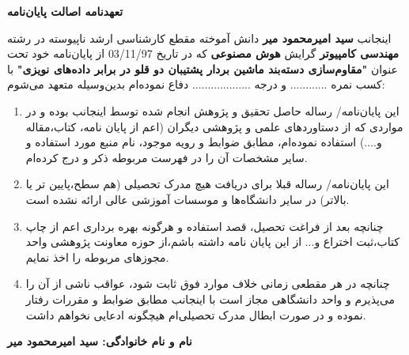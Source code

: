\thispagestyle{empty}
\noindent

\textbf{\Large تعهدنامه اصالت  پایان‌نامه}
\vskip 1cm

اینجانب \textbf{سید امیرمحمود میر} دانش آموخته مقطع کارشناسی ارشد ناپیوسته در رشته \textbf{مهندسی کامپیوتر} گرایش \textbf{هوش مصنوعی} که در تاریخ 03/11/97 از پایان‌نامه خود تحت عنوان \textbf{"مقاوم‌سازی دسته‌بند ماشین بردار پشتیبان دو قلو در برابر داده‌های نویزی"} با کسب نمره ............ و درجه ................... دفاع نموده‌ام بدین‌وسیله متعهد می‌شوم:
\begin{enumerate}
	\item این پایان‌نامه/ رساله حاصل تحقیق و پژوهش انجام شده توسط اینجانب بوده و در مواردی که از دستاوردهای علمی و پژوهشی دیگران (اعم از پایان نامه، کتاب،مقاله و....) استفاده نموده‌ام، مطابق ضوابط و رویه موجود، نام منبع مورد استفاده و سایر مشخصات آن را در فهرست مربوطه ذکر و درج کرده‌ام.
	\item این پایان‌نامه/ رساله قبلا برای دریافت هیچ مدرک تحصیلی (هم سطح،پایین تر یا بالاتر) در سایر دانشگاه‌ها و موسسات آموزشی عالی ارائه نشده است.
	\item 	چنانچه بعد از فراغت تحصیل، قصد استفاده و هرگونه بهره برداری اعم از چاپ کتاب،ثبت اختراع و... از این پایان نامه داشته باشم،از حوزه معاونت پژوهشی واحد مجوزهای مربوطه را اخذ نمایم.
	\item 	چنانچه در هر مقطعی زمانی خلاف موارد فوق ثابت شود، عواقب ناشی از آن را می‌پذیرم و واحد دانشگاهی مجاز است با اینجانب مطابق ضوابط و مقررات رفتار نموده و در صورت ابطال مدرک تحصیلی‌ام هیچگونه ادعایی نخواهم داشت.
\end{enumerate}

\vskip 0.5cm
\begin{flushleft}
\textbf{نام و نام خانوادگی: سید امیرمحمود میر}
\end{flushleft}